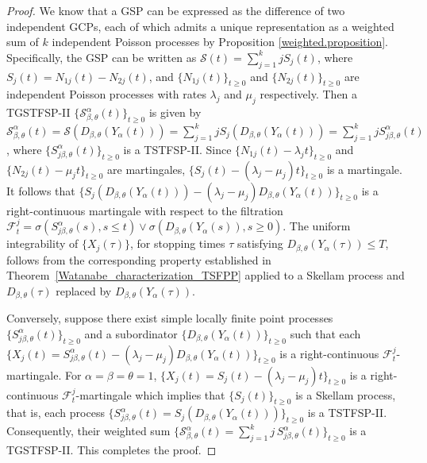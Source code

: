 \documentclass[11pt,oneside,reqno]{amsart}
\theoremstyle{definition}
\newtheorem{corollary}{Corollary}[section]
\theoremstyle{remarkstyle}
\begin{document}
\begin{proof}
    We know that a GSP can be expressed as the difference of two independent GCPs, each of which admits a unique representation as a weighted sum of $k$ independent Poisson processes by Proposition \ref{weighted.proposition}. Specifically, the GSP can be written as $\mathcal{S}(t)=\sum_{j=1}^{k} jS_j(t)$, where $S_{j}(t)=N_{1j}(t)-N_{2j}(t)$, and $\{N_{1j}(t)\}_{t\ge0}$ and $\{N_{2j}(t)\}_{t\ge0}$ are independent Poisson processes with rates $\lambda_j$ and $\mu_j$ respectively. Then a TGSTFSP-II $\{\mathcal{S}^{\alpha}_{\beta,\theta}(t)\}_{t\ge 0}$ is given by $\mathcal{S}^{\alpha}_{\beta,\theta}(t)=\mathcal{S}(D_{\beta,\theta}(Y_{\alpha}(t)))=\sum_{j=1}^{k} jS_j(D_{\beta,\theta}(Y_{\alpha}(t)))=\sum_{j=1}^{k} jS_{j\beta,\theta}^{\alpha}(t)$, where $\{S_{j\beta,\theta}^{\alpha}(t)\}_{t\ge 0}$ is a TSTFSP-II. Since $\{N_{1j}(t)-\lambda_jt\}_{t\ge0}$ and $\{N_{2j}(t)-\mu_jt\}_{t\ge0}$ are martingales, $\{S_j(t)-(\lambda_j-\mu_j)t\}_{t\ge 0}$ is a martingale. It follows that $\{S_j(D_{\beta,\theta}(Y_{\alpha}(t)))-(\lambda_j-\mu_j)D_{\beta,\theta}(Y_{\alpha}(t))\}_{t\ge 0}$ is a right-continuous martingale with respect to the filtration $\mathcal{F}_t^j=\sigma(S^{\alpha}_{j\beta,\theta}(s),s\le t)\vee\sigma(D_{\beta,\theta}(Y_{\alpha}(s)),s\ge0)$. The uniform integrability of $\{X_j(\tau)\}$, for stopping times $\tau$ satisfying $D_{\beta,\theta}(Y_\alpha(\tau))\le T$, follows from the corresponding property established in Theorem~\ref{Watanabe_characterization_TSFPP} applied to a Skellam process and $D_{\beta,\theta}(\tau)$ replaced by $D_{\beta,\theta}(Y_{\alpha}(\tau))$.

Conversely, suppose there exist simple locally finite point processes $\{S^{\alpha}_{j\beta,\theta}(t)\}_{t\ge0}$ and a subordinator $\{D_{\beta,\theta}(Y_{\alpha}(t))\}_{t\ge 0}$ such that each $\{X_j(t)=S^{\alpha}_{j\beta,\theta}(t)-(\lambda_j-\mu_j)D_{\beta,\theta}(Y_{\alpha}(t))\}_{t\ge 0}$ is a right-continuous $\mathcal{F}_t^j$-martingale. For $\alpha=\beta=\theta=1$, $\{X_j(t)=S_{j}(t)-(\lambda_j-\mu_j)t\}_{t\ge 0}$ is a right-continuous $\mathcal{F}_t^j$-martingale which implies that $\{S_j(t)\}_{t\ge 0}$ is a Skellam process, that is, each process $\{S^{\alpha}_{j\beta,\theta}(t)=S_{j}(D_{\beta,\theta}(Y_{\alpha}(t)))\}_{t\ge 0}$ is a TSTFSP-II. Consequently, their weighted sum $\{\mathcal{S}^{\alpha}_{\beta,\theta}(t)=\sum_{j=1}^{k} j\,S^{\alpha}_{j\beta,\theta}(t)\}_{t\ge 0}$ is a TGSTFSP-II. This completes the proof.
\end{proof}
\end{document}
